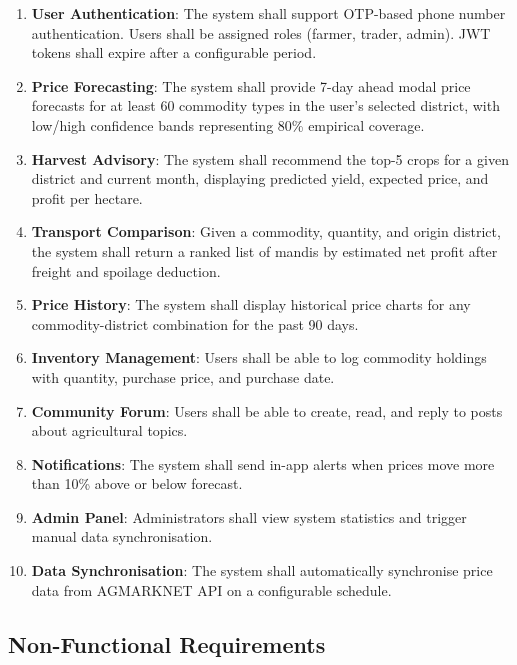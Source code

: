\documentclass[12pt,a4paper]{report}
\begin{document}
\begin{enumerate}
    \item \textbf{User Authentication}: The system shall support OTP-based phone number
    authentication. Users shall be assigned roles (farmer, trader, admin). JWT tokens
    shall expire after a configurable period.
    \item \textbf{Price Forecasting}: The system shall provide 7-day ahead modal price
    forecasts for at least 60 commodity types in the user's selected district, with
    low/high confidence bands representing 80\% empirical coverage.
    \item \textbf{Harvest Advisory}: The system shall recommend the top-5 crops for a
    given district and current month, displaying predicted yield, expected price, and
    profit per hectare.
    \item \textbf{Transport Comparison}: Given a commodity, quantity, and origin district,
    the system shall return a ranked list of mandis by estimated net profit after freight
    and spoilage deduction.
    \item \textbf{Price History}: The system shall display historical price charts for any
    commodity-district combination for the past 90 days.
    \item \textbf{Inventory Management}: Users shall be able to log commodity holdings with
    quantity, purchase price, and purchase date.
    \item \textbf{Community Forum}: Users shall be able to create, read, and reply to posts
    about agricultural topics.
    \item \textbf{Notifications}: The system shall send in-app alerts when prices move more
    than 10\% above or below forecast.
    \item \textbf{Admin Panel}: Administrators shall view system statistics and trigger
    manual data synchronisation.
    \item \textbf{Data Synchronisation}: The system shall automatically synchronise price
    data from AGMARKNET API on a configurable schedule.
\end{enumerate}

\subsection{Non-Functional Requirements}
\end{document}
